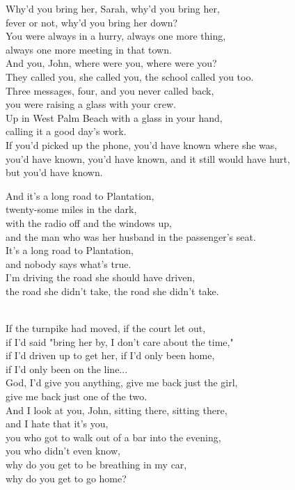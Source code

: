\begin{lyrics}
Why'd you bring her, Sarah, why'd you bring her,\\
fever or not, why'd you bring her down?\\
You were always in a hurry, always one more thing,\\
always one more meeting in that town.\\
And you, John, where were you, where were you?\\
They called you, she called you, the school called you too.\\
Three messages, four, and you never called back,\\
you were raising a glass with your crew.\\
Up in West Palm Beach with a glass in your hand,\\
calling it a good day's work.\\
If you'd picked up the phone, you'd have known where she was,\\
you'd have known, you'd have known, and it still would have hurt,\\
but you'd have known.

And it's a long road to Plantation,\\
twenty-some miles in the dark,\\
with the radio off and the windows up,\\
and the man who was her husband in the passenger's seat.\\
It's a long road to Plantation,\\
and nobody says what's true.\\
I'm driving the road she should have driven,\\
the road she didn't take, the road she didn't take.

\\
If the turnpike had moved, if the court let out,\\
if I'd said "bring her by, I don't care about the time,"\\
if I'd driven up to get her, if I'd only been home,\\
if I'd only been on the line...\\
God, I'd give you anything, give me back just the girl,\\
give me back just one of the two.\\
And I look at you, John, sitting there, sitting there,\\
and I hate that it's you,\\
you who got to walk out of a bar into the evening,\\
you who didn't even know,\\
why do you get to be breathing in my car,\\
why do you get to go home?


\end{lyrics}
